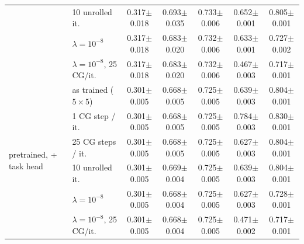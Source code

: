 \begin{tabular}{llccccc}
 & 10 unrolled it. & 0.317{\scriptsize$\pm$0.018} & 0.693{\scriptsize$\pm$0.035} & 0.733{\scriptsize$\pm$0.006} & 0.652{\scriptsize$\pm$0.001} & 0.805{\scriptsize$\pm$0.001} \\
 & $\lambda = 10^{-8}$ & 0.317{\scriptsize$\pm$0.018} & 0.683{\scriptsize$\pm$0.020} & 0.732{\scriptsize$\pm$0.006} & 0.633{\scriptsize$\pm$0.001} & 0.727{\scriptsize$\pm$0.002} \\
 & $\lambda = 10^{-8}$, 25 CG/it. & 0.317{\scriptsize$\pm$0.018} & 0.683{\scriptsize$\pm$0.020} & 0.732{\scriptsize$\pm$0.006} & 0.467{\scriptsize$\pm$0.003} & 0.717{\scriptsize$\pm$0.001} \\
\midrule
\multirow{6}{*}{pretrained, + task head} & as trained ($5 \times 5$) & 0.301{\scriptsize$\pm$0.005} & 0.668{\scriptsize$\pm$0.005} & 0.725{\scriptsize$\pm$0.005} & 0.639{\scriptsize$\pm$0.003} & 0.804{\scriptsize$\pm$0.001} \\
 & 1 CG step / it. & 0.301{\scriptsize$\pm$0.005} & 0.668{\scriptsize$\pm$0.005} & 0.725{\scriptsize$\pm$0.005} & 0.784{\scriptsize$\pm$0.003} & 0.830{\scriptsize$\pm$0.001} \\
 & 25 CG steps / it. & 0.301{\scriptsize$\pm$0.005} & 0.668{\scriptsize$\pm$0.005} & 0.725{\scriptsize$\pm$0.005} & 0.627{\scriptsize$\pm$0.003} & 0.804{\scriptsize$\pm$0.001} \\
 & 10 unrolled it. & 0.301{\scriptsize$\pm$0.005} & 0.669{\scriptsize$\pm$0.004} & 0.725{\scriptsize$\pm$0.005} & 0.639{\scriptsize$\pm$0.003} & 0.804{\scriptsize$\pm$0.001} \\
 & $\lambda = 10^{-8}$ & 0.301{\scriptsize$\pm$0.005} & 0.668{\scriptsize$\pm$0.004} & 0.725{\scriptsize$\pm$0.005} & 0.627{\scriptsize$\pm$0.003} & 0.728{\scriptsize$\pm$0.001} \\
 & $\lambda = 10^{-8}$, 25 CG/it. & 0.301{\scriptsize$\pm$0.005} & 0.668{\scriptsize$\pm$0.004} & 0.725{\scriptsize$\pm$0.005} & 0.471{\scriptsize$\pm$0.002} & 0.717{\scriptsize$\pm$0.001} \\
\bottomrule
\end{tabular}
